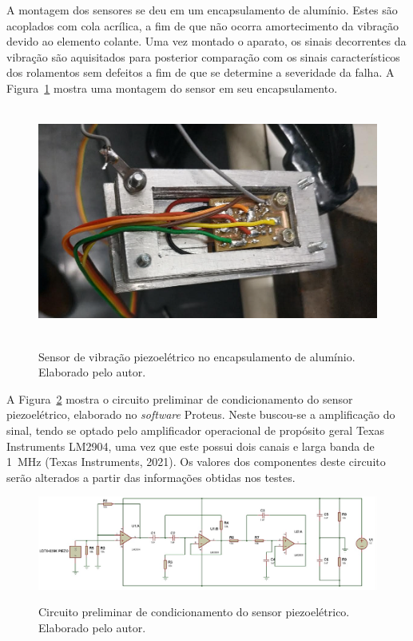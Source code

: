 \documentclass[
	12pt,				
	oneside,			
	a4paper,			
	english,			
	brazil,			
	]{abntex2ppgsi}
\begin{document}
A montagem dos sensores se deu em um encapsulamento de alumínio. Estes são acoplados com cola acrílica, a fim de que não ocorra amortecimento da vibração devido ao elemento colante. Uma vez montado o aparato, os sinais decorrentes da vibração são aquisitados para posterior comparação com os sinais característicos dos rolamentos sem defeitos a fim de que se determine a severidade da falha. A Figura~\ref{encapsulamento_sensor} mostra uma montagem do sensor em seu encapsulamento.

\begin{figure}[H]
\centering
\caption {Sensor de vibração piezoelétrico no encapsulamento de alumínio. Elaborado pelo autor.}
\includegraphics[width=\textwidth,height=75mm,keepaspectratio]{encapsulamento_sensor}
\label{encapsulamento_sensor}
\end{figure} 

A Figura~\ref{circuito_sensor} mostra o circuito preliminar de condicionamento do sensor piezoelétrico, elaborado no \textit{software} Proteus. Neste buscou-se a amplificação do sinal, tendo se optado pelo amplificador operacional de propósito geral Texas Instruments LM2904, uma vez que este possui dois canais e larga banda de \SI{1}{\mega\hertz} (Texas Instruments, 2021). Os valores dos componentes deste circuito serão alterados a partir das informações obtidas nos testes.

\begin{figure}[H]
\centering
\caption {Circuito preliminar de condicionamento do sensor piezoelétrico. Elaborado pelo autor.}
\includegraphics[width=\textwidth,height=\textheight,keepaspectratio]{circuito_sensor}
\label{circuito_sensor}
\end{figure} 
\end{document}

